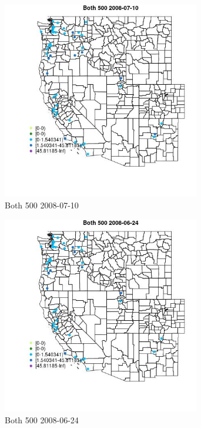 \begin{figure} 
\centering  
\includegraphics[width=0.77\textwidth]{Code_Outputs/Report_ML_input_PM25_Step4_part_e_de_duplicated_aves_MapObsBoth_5002008-07-10.jpg} 
\caption{\label{fig:Report_ML_input_PM25_Step4_part_e_de_duplicated_avesMapObsBoth_5002008-07-10}Both 500 2008-07-10} 
\end{figure} 
 

\begin{figure} 
\centering  
\includegraphics[width=0.77\textwidth]{Code_Outputs/Report_ML_input_PM25_Step4_part_e_de_duplicated_aves_MapObsBoth_5002008-06-24.jpg} 
\caption{\label{fig:Report_ML_input_PM25_Step4_part_e_de_duplicated_avesMapObsBoth_5002008-06-24}Both 500 2008-06-24} 
\end{figure} 
 

